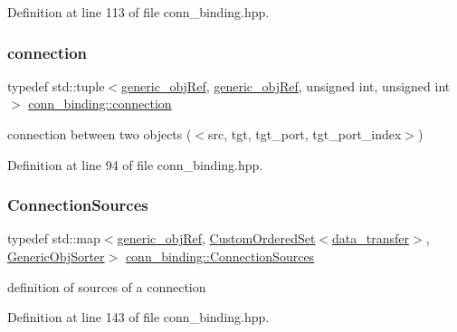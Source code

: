 Definition at line 113 of file conn\+\_\+binding.\+hpp.

\mbox{\label{classconn__binding_aefee92bcc9e59d19b7a3e55e2cbdf615}} 
\subsubsection{\texorpdfstring{connection}{connection}}
{\footnotesize\ttfamily typedef std\+::tuple$<$\hyperlink{generic__obj_8hpp_acb533b2ef8e0fe72e09a04d20904ca81}{generic\+\_\+obj\+Ref}, \hyperlink{generic__obj_8hpp_acb533b2ef8e0fe72e09a04d20904ca81}{generic\+\_\+obj\+Ref}, unsigned int, unsigned int$>$ \hyperlink{classconn__binding_aefee92bcc9e59d19b7a3e55e2cbdf615}{conn\+\_\+binding\+::connection}}



connection between two objects ($<$src, tgt, tgt\+\_\+port, tgt\+\_\+port\+\_\+index$>$) 



Definition at line 94 of file conn\+\_\+binding.\+hpp.

\mbox{\label{classconn__binding_aa5406c3bf4cee893234c2b0847471f56}} 
\subsubsection{\texorpdfstring{Connection\+Sources}{ConnectionSources}}
{\footnotesize\ttfamily typedef std\+::map$<$\hyperlink{generic__obj_8hpp_acb533b2ef8e0fe72e09a04d20904ca81}{generic\+\_\+obj\+Ref}, \hyperlink{classCustomOrderedSet}{Custom\+Ordered\+Set}$<$\hyperlink{conn__binding_8hpp_ae44ffa64566f2bb3ce6941833ac940fb}{data\+\_\+transfer}$>$, \hyperlink{classGenericObjSorter}{Generic\+Obj\+Sorter}$>$ \hyperlink{classconn__binding_aa5406c3bf4cee893234c2b0847471f56}{conn\+\_\+binding\+::\+Connection\+Sources}}



definition of sources of a connection 



Definition at line 143 of file conn\+\_\+binding.\+hpp.

\mbox{\label{classconn__binding_a08cb5241cd588e215f61ab30d27a14c0}} 

